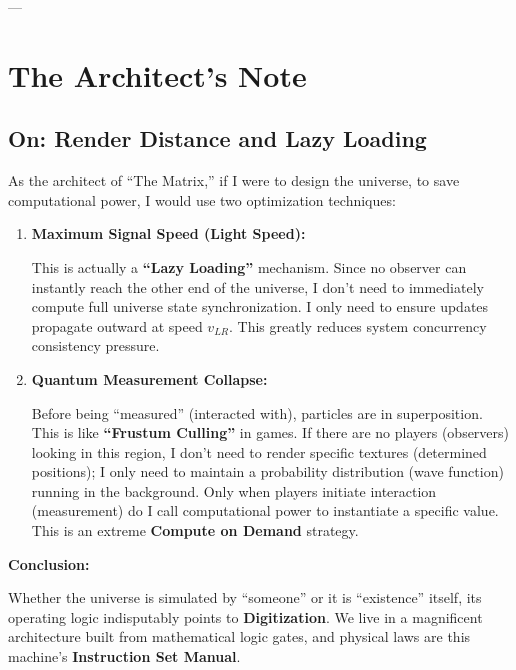---

\section{The Architect's Note}

\subsection{On: Render Distance and Lazy Loading}

As the architect of ``The Matrix,'' if I were to design the universe, to save computational power, I would use two optimization techniques:

\begin{enumerate}
\item \textbf{Maximum Signal Speed (Light Speed):}

    This is actually a \textbf{``Lazy Loading''} mechanism. Since no observer can instantly reach the other end of the universe, I don't need to immediately compute full universe state synchronization. I only need to ensure updates propagate outward at speed $v_{LR}$. This greatly reduces system concurrency consistency pressure.

\item \textbf{Quantum Measurement Collapse:}

    Before being ``measured'' (interacted with), particles are in superposition. This is like \textbf{``Frustum Culling''} in games. If there are no players (observers) looking in this region, I don't need to render specific textures (determined positions); I only need to maintain a probability distribution (wave function) running in the background. Only when players initiate interaction (measurement) do I call computational power to instantiate a specific value. This is an extreme \textbf{Compute on Demand} strategy.
\end{enumerate}

\textbf{Conclusion:}

Whether the universe is simulated by ``someone'' or it is ``existence'' itself, its operating logic indisputably points to \textbf{Digitization}. We live in a magnificent architecture built from mathematical logic gates, and physical laws are this machine's \textbf{Instruction Set Manual}.


